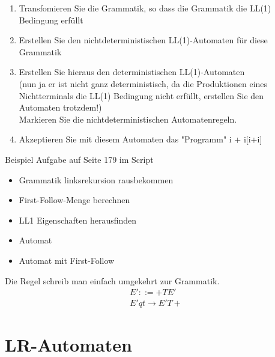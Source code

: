 \begin{enumerate}
  \item Transfomieren Sie die Grammatik, so dass die Grammatik die LL(1) Bedingung erfüllt
  \item Erstellen Sie den nichtdeterministischen LL(1)-Automaten für diese Grammatik
  \item Erstellen Sie hieraus den deterministischen LL(1)-Automaten\\ (nun ja er ist nicht ganz deterministisch, da die Produktionen eines Nichtterminals die LL(1) Bedingung nicht erfüllt, erstellen Sie den Automaten trotzdem!)\\
  Markieren Sie die nichtdeterministischen Automatenregeln.
  \item Akzeptieren Sie mit diesem Automaten das "Programm" i + i[i+i]
\end{enumerate}
Beispiel Aufgabe auf Seite 179 im Script\\
\begin{itemize}
  \item Grammatik linksrekursion rausbekommen
  \item First-Follow-Menge berechnen 
  \item LL1 Eigenschaften herausfinden
  \item Automat
  \item Automat mit First-Follow
\end{itemize}
Die Regel schreib man einfach umgekehrt zur Grammatik.
\begin{align*}
  E' ::= +TE'\\
  E'qt\longrightarrow E'T+
\end{align*}


\section{LR-Automaten}

